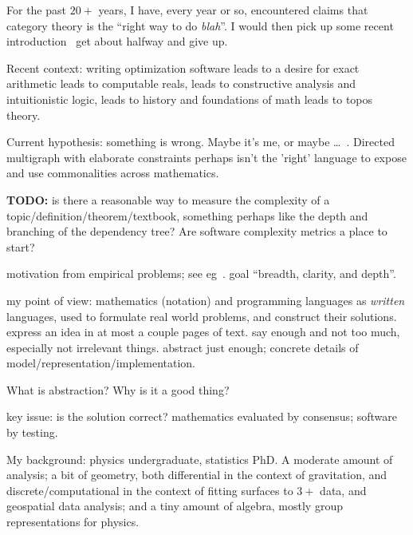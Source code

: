 \documentclass[11pt,openany]{book}
\begin{document}
For the past $20+$ years, I have, every year or so,
encountered claims that
category theory is the ``right way to do \emph{blah}''.
I would then pick up some recent 
introduction~\cite{AdamekHerrlichStrecker:1990,
AspertiLongo:1991,Awodey:2010,
BarrWells:2020,
Geroch:1985:MathPhysics,Hillman:2001:CatPrimer,LawvereSchanuel:2009:ConceptualMath,
Leinster:2016:BasicCategoryTheory,
Maclane:19968:CategoriesWorking,nLab:2020,
Riehl:2017:CatTheory,
Spivak:2013:CatTheoryForScientists,Spivak:2014:CatTheoryForSciences} 
get about halfway and give up.

Recent context: 
writing optimization software 
leads to a desire for exact arithmetic 
leads to computable reals,
leads to constructive analysis and intuitionistic logic,
leads to history and foundations of math 
leads to topos theory.

Current hypothesis: something is wrong.
Maybe it's me, or maybe \ldots\ . 
Directed multigraph with elaborate constraints 
perhaps isn't the 'right' language to
expose and use commonalities across mathematics.

\textbf{TODO:} is there a reasonable way to measure 
the complexity of a topic/definition/theorem/textbook,
something perhaps like the depth and branching of the
dependency tree? Are software complexity metrics a place to start?

motivation from empirical problems; 
see eg~\cite{Maclane:1981:MathModels}.
goal ``breadth, clarity, and depth''.

my point of view: 
mathematics (notation) and programming languages
as \emph{written} languages,
used to formulate real world problems,
and construct their solutions.
express an idea in at most a couple pages of text.
say enough and not too much, especially not irrelevant things.
abstract just enough; 
concrete details of model/representation/implementation.

What is abstraction? Why is it a good thing? 

key issue: is the solution correct?
mathematics evaluated by consensus;
software by testing.

My background: physics undergraduate, statistics PhD.
A moderate amount of analysis; 
a bit of geometry, both
differential in the context of gravitation, and
discrete/computational in the context of fitting surfaces to
$3+$ data, and geospatial data analysis;
and a tiny amount of algebra, mostly group representations
for physics.
\end{document}
